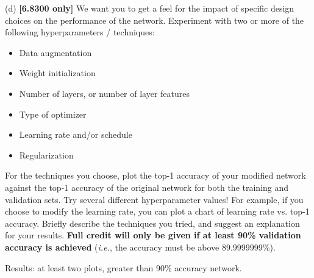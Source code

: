 \documentclass[11pt]{article}
\begin{document}
(d) \textbf{[6.8300 only]}  We want you to get a feel for the impact of specific design choices on the performance of the network. Experiment with two or more of the following hyperparameters / techniques:

\begin{itemize}
    \item Data augmentation
    \item Weight initialization
    \item Number of layers, or number of layer features
    \item Type of optimizer
    \item Learning rate and/or schedule
    \item Regularization
\end{itemize}

For the techniques you choose, plot the top-1 accuracy of your modified network against the top-1 accuracy of the original network for both the training and validation sets. Try several different hyperparameter values! For example, if you choose to modify the learning rate, you can plot a chart of learning rate vs. top-1 accuracy. Briefly describe the techniques you tried, and suggest an explanation for your results. \textbf{Full credit will only be given if at least 90\% validation accuracy is achieved} (\textit{i.e.}, the accuracy must be above 89.9999999\%).

Results: at least two plots, greater than 90\% accuracy network. 
\end{document}
